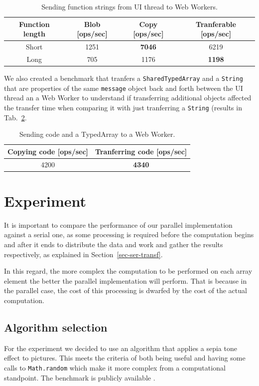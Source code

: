 \documentclass[runningheads,a4paper]{llncs}
\begin{document}
\begin{table}
  \centering
  \begin{tabular}{|c|c|c|c|}
    \hline
    Function length & Blob [ops/sec] & Copy [ops/sec] & Tranferable [ops/sec] \\
    \hline
    Short & 1251 & \textbf{7046} & 6219 \\
    Long & 705 & 1176 & \textbf{1198} \\
    \hline
  \end{tabular}
  \caption{Sending function strings from UI thread to Web Workers.}
  \label{tab:send-function}
\end{table}

We also created a benchmark that tranfers a \verb+SharedTypedArray+ and a \verb+String+ that are properties of the same \verb+message+ object back and forth between the UI thread an a Web Worker to understand if transferring additional objects affected the transfer time when comparing it with just tranferring a \verb+String+ (results in Tab.~\ref{tab:send-function-and-array}.
\begin{table}
  \centering
  \begin{tabular}{|c|c|}
    \hline
    Copying code [ops/sec] & Tranferring code [ops/sec] \\
    \hline
    4200 & \textbf{4340} \\
    \hline
  \end{tabular}
  \caption{Sending code and a TypedArray to a Web Worker.}
  \label{tab:send-function-and-array}
\end{table}

\section{Experiment}
It is important to compare the performance of our parallel implementation against a serial one, as some processing is required before the computation begins and after it ends to distribute the data and work and gather the results respectively, as explained in Section~\ref{sec-ser-transf}.

In this regard, the more complex the computation to be performed on each array element the better the parallel implementation will perform. That is because in the parallel case, the cost of this processing is dwarfed by the cost of the actual computation.

\subsection{Algorithm selection}
For the experiment we decided to use an algorithm that applies a sepia tone effect to pictures. This meets the criteria of both being useful and having some calls to \verb+Math.random+ which make it more complex from a computational standpoint. The benchmark is publicly available \cite{benchmark}.
\end{document}
